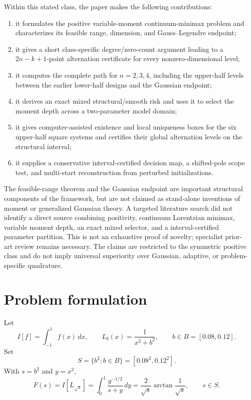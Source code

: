 \documentclass[preprint,12pt]{elsarticle}
\theoremstyle{remark}
\begin{document}
Within this stated class, the paper makes the following contributions:
\begin{enumerate}[label=(\roman*)]
\item it formulates the positive variable-moment continuum-minimax
problem and characterizes its feasible range, dimension, and
Gauss--Legendre endpoint;
\item it gives a short class-specific degree/zero-count argument leading
to a \(2n-k+1\)-point alternation certificate for every
nonzero-dimensional level;
\item it computes the complete path for \(n=2,3,4\), including the
upper-half levels between the earlier lower-half designs and the
Gaussian endpoint;
\item it derives an exact mixed structural/smooth risk and uses it to
select the moment depth across a two-parameter model domain;
\item it gives computer-assisted existence and local uniqueness boxes for
the six upper-half square systems and certifies their global alternation
levels on the structural interval;
\item it supplies a conservative interval-certified decision map, a shifted-pole
scope test, and multi-start reconstruction from perturbed initializations.
\end{enumerate}

The feasible-range theorem and the Gaussian endpoint are important
structural components of the framework, but are not claimed as
stand-alone inventions of moment or generalized Gaussian theory. A
targeted literature search did not identify a direct source combining
positivity, continuum Lorentzian minimax, variable moment depth, an exact
mixed selector, and a interval-certified parameter partition. This is not an
exhaustive proof of novelty; specialist prior-art review remains
necessary. The claims are restricted to the symmetric positive class
and do not imply universal superiority over Gaussian, adaptive, or
problem-specific quadrature.

\section{Problem formulation}

Let
\[
I[f]=\int_{-1}^{1} f(x)\,dx,
\qquad
L_b(x)=\frac{1}{x^2+b^2},
\qquad
b\in B=[0.08,0.12].
\]
Set
\[
S=\{b^2:b\in B\}=[0.08^2,0.12^2].
\]
With \(s=b^2\) and \(y=x^2\),
\[
F(s)=I[L_{\sqrt{s}}]
=\int_0^1\frac{y^{-1/2}}{s+y}\,dy
=\frac{2}{\sqrt{s}}\arctan\frac{1}{\sqrt{s}},
\qquad s\in S.
\]
\end{document}
